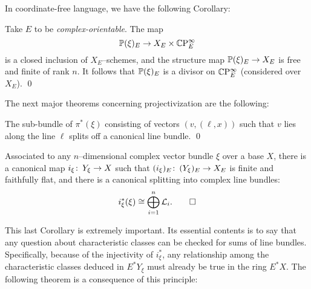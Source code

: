 In coordinate-free language, we have the following Corollary:
\begin{corollary}
Take $E$ to be \emph{complex-orientable}.  The map \[\P(\xi)_E \to X_E \times \CP^\infty_E\] is a closed inclusion of $X_E$--schemes, and the structure map $\P(\xi)_E \to X_E$ is free and finite of rank $n$.  It follows that $\P(\xi)_E$ is a divisor on $\CP^\infty_E$ (considered over $X_E$). \qed {}
\end{corollary}

The next major theorems concerning projectivization are the following:

\begin{corollary}
The sub-bundle of $\pi^*(\xi)$ consisting of vectors $(v, (\ell, x))$ such that $v$ lies along the line $\ell$ splits off a canonical line bundle. \qed
\end{corollary}

\begin{corollary}
Associated to any $n$--dimensional complex vector bundle $\xi$ over a base $X$, there is a canonical map $i_\xi\co Y_\xi \to X$ such that $(i_\xi)_E\co (Y_\xi)_E \to X_E$ is finite and faithfully flat, and there is a canonical splitting into complex line bundles: \[i_\xi^*(\xi) \cong \bigoplus_{i=1}^n \L_i. \qed\]
\end{corollary}

This last Corollary is extremely important.  Its essential contents is to say that any question about characteristic classes can be checked for sums of line bundles.  Specifically, because of the injectivity of $i_\xi^*$, any relationship among the characteristic classes deduced in $E^* Y_\xi$ must already be true in the ring $E^* X$.  The following theorem is a consequence of this principle:

